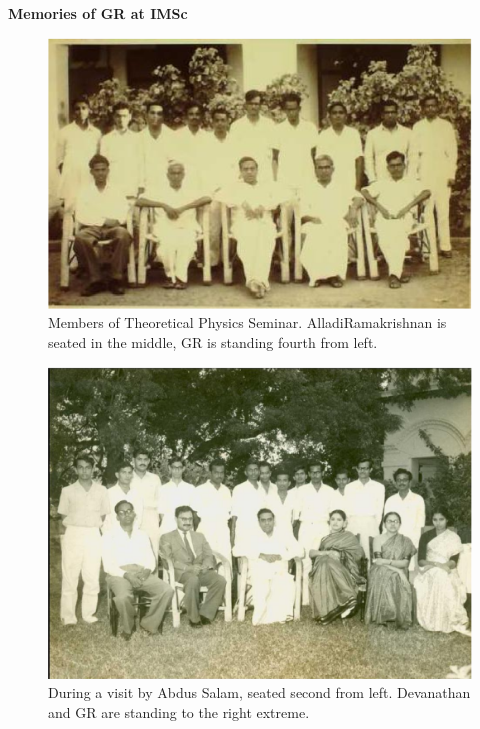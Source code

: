 \eject

\begin{center}
{\bf \Large Memories of GR at IMSc}
\end{center}

\begin{figure}[H]
\centering
\includegraphics[scale=0.33]{src/images/chap25/2.eps}
\caption{Members of Theoretical Physics Seminar. Alladi\break Ramakrishnan is seated
in the middle, GR is standing fourth from left.}
\end{figure}
\medskip

\begin{figure}[H]
\centering
\includegraphics[scale=0.33]{src/images/chap25/3.eps}
\caption{During a visit by Abdus Salam, seated second from left. Devanathan and
GR are standing to the right extreme.}
\end{figure}

